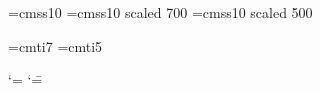 \def\setfam#1#2#3#4#5{%
	\textfont#1=\csname#3#2\endcsname%
	\scriptfont#1=\csname#4#2\endcsname%
	\scriptscriptfont#1=\csname#5#2\endcsname%
}

\def\makenumeralsfam#1{%
	\mathcode`\0="0#130%
	\mathcode`\1="0#131%
	\mathcode`\2="0#132%
	\mathcode`\3="0#133%
	\mathcode`\4="0#134%
	\mathcode`\5="0#135%
	\mathcode`\6="0#136%
	\mathcode`\7="0#137%
	\mathcode`\8="0#138%
	\mathcode`\9="0#139%
}



\font\tenss=cmss10
\font\sevenss=cmss10 scaled 700%
\font\fivess=cmss10 scaled 500%

\def\ssmath{%
	\setfam{15}{ss}{ten}{seven}{five}%
	\everymath{\fam15}%
	\makenumeralsfam0%
}



\font\sevenit=cmti7
\font\fiveit=cmti5

\def\itmath{%
	\setfam{15}{it}{ten}{seven}{five}%
	\everymath{\fam15}%
	\makenumeralsfam0%
}


%

\newdimen\heightmodelinitialbarheight
\newdimen\heightmodelbaradvance
\newdimen\heightmodelbarwidth
\newdimen\heightmodelspace

\heightmodelinitialbarheight=16pt%
\heightmodelbaradvance=8pt%
\heightmodelbarwidth=6pt%
\heightmodelspace=8pt%


\newdimen\heightmodelbarheight
\def\resetheightmodelbarheight{\heightmodelbarheight=\heightmodelinitialbarheight}

\def\heightmodelbar{\vrule height\heightmodelbarheight width\heightmodelbarwidth}

\def\heightmodelitem{%
	\ensureline\vbox\bgroup%
		\halign\bgroup%
			\hss##\hss\cr%
			\hbox{\heightmodelbar}\cr%
}
\def\endheightmodelitem{\cr\egroup\egroup}

\begingroup
\catcode`\<=\active
\catcode`\==\active%
\gdef\heightmodel{\ensureline\hbox\bgroup%
	\resetheightmodelbarheight%
	\catcode`\<\active%
	\catcode`\=\active%
	\def={%
		\endheightmodelitem%
		\hskip\heightmodelspace%
		\heightmodelitem%
	}%
	\def<{%
		\endheightmodelitem%
		\advance\heightmodelbarheight by\heightmodelbaradvance%
		\hskip\heightmodelspace%
		\heightmodelitem%
	}%
	\ignoreallspaces%
	\let\par\relax%
	\obeylines%
	\heightmodelitem%
}
\endgroup

\def\endheightmodel{\endheightmodelitem\egroup}
